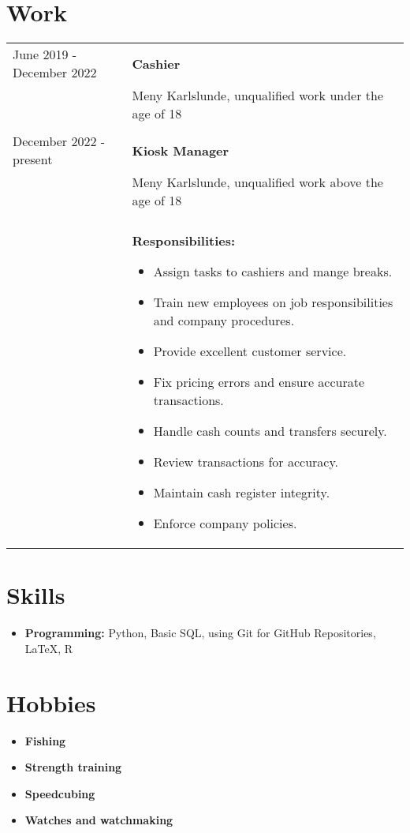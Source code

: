 \documentclass[12pt]{article}
\begin{document}
\section{Work}
\begin{tabular}{ l p{6in} }
June 2019 - December 2022 & \textbf{Cashier} \\
                           & Meny Karlslunde, unqualified work under the age of 18 \\
   & \\                           
December 2022 - present & \textbf{Kiosk Manager} \\
                        & Meny Karlslunde, unqualified work above the age of 18 \\
		  & \\
                        & \textbf{Responsibilities:}
                        \begin{itemize}
  			    \item Assign tasks to cashiers and mange breaks.
			    \item Train new employees on job responsibilities \newline and company procedures.
                                    \item Provide excellent customer service.
                                    \item Fix pricing errors and ensure accurate transactions.
                                    \item Handle cash counts and transfers securely.
                                    \item Review transactions for accuracy.
                                    \item Maintain cash register integrity.
                                    \item Enforce company policies.
                        \end{itemize} \\
\end{tabular}

\newpage
\section{Skills}
\begin{itemize}
    \itemsep=-.3em
    \item \textbf{Programming:} Python, Basic SQL, using Git for GitHub Repositories, LaTeX, R
\end{itemize}

\section{Hobbies}
\begin{itemize}
   \itemsep=.3em
   \item \textbf{Fishing}
   \item \textbf{Strength training}
   \item \textbf{Speedcubing}	
   \item \textbf{Watches and watchmaking}
\end{itemize}
\end{document}
